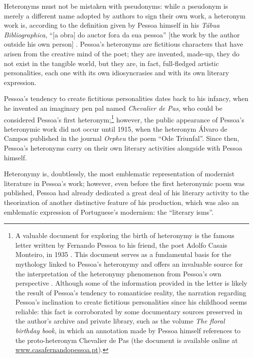 \begin{paper}
Heteronyms must not be mistaken with pseudonyms: while a pseudonym is
merely a different name adopted by authors to sign their own work, a
heteronym work is, according to the definition given by Pessoa himself
in his \emph{Tábua Bibliographica}, ``[a obra] do auctor fora da sua
pessoa'' [the work by the author outside his own person]
\parencite{pessoa_tabua_1928}. Pessoa's heteronyms are fictitious characters that have arisen from the
creative mind of the poet; they are invented, made-up, they do not exist
in the tangible world, but they are, in fact, full-fledged artistic
personalities, each one with its own idiosyncrasies and with its own
literary expression.

Pessoa's tendency to create fictitious personalities dates back to his
infancy, when he invented an imaginary pen pal named \emph{Chevalier de
Pas,} who could be considered Pessoa's first heteronym;\footnote{A
  valuable document for exploring the birth of heteronymy is the famous
  letter written by Fernando Pessoa to his friend, the poet Adolfo
  Casais Monteiro, in 1935 \citep[251--262]{pessoa_cartas_1998}. This document serves
  as a fundamental basis for the mythology linked to Pessoa's heteronymy
  and offers an invaluable source for the interpretation of the
  heteronymy phenomenon from Pessoa's own perspective \citep{sousa_nos_2015}.
  Although some of the information provided in the letter is likely the
  result of Pessoa's tendency to romanticise reality, the narration
  regarding Pessoa's inclination to create fictitious personalities
  since his childhood seems reliable: this fact is corroborated by some
  documentary sources preserved in the author's archive and private
  library, such as the volume \emph{The floral birthday book,} in which
  an annotation made by Pessoa himself references to the proto-heteronym
  Chevalier de Pas (the document is available online at
  \url{www.casafernandopessoa.pt}).} however, the public appearance of
Pessoa's heteronymic work did not occur until 1915, when the heteronym
Álvaro de Campos published in the journal \emph{Orpheu} the poem ``Ode
Triunfal''. Since then, Pessoa's heteronyms carry on their own literary
activities alongside with Pessoa himself.

Heteronymy is, doubtlessly, the most emblematic representation of
modernist literature in Pessoa's work; however, even before the first
heteronymic poem was published, Pessoa had already dedicated a great
deal of his literary activity to the theorization of another distinctive
feature of his production, which was also an emblematic expression of
Portuguese's modernism: the ``literary isms''.


\end{paper}
